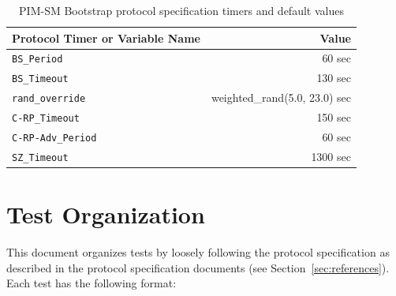 \documentclass[11pt]{report}
\begin{document}
\begin{table}[h]
\begin{center}
\begin{tabular}{|l|r|}
\hline
Protocol Timer or Variable Name	& Value		\\
\hline
\hline
\verb=BS_Period=		& 60 sec	\\
\verb=BS_Timeout=		& 130 sec	\\
\verb=rand_override=		& weighted\_rand(5.0, 23.0) sec \\
\verb=C-RP_Timeout=		& 150 sec	\\
\verb=C-RP-Adv_Period=		& 60 sec	\\
\verb=SZ_Timeout=		& 1300 sec	\\
\hline
\end{tabular}
\caption{PIM-SM Bootstrap protocol specification timers and default values}
\label{table:pim_sm_bootstrap_spec_values}
\end{center}
\end{table}

\section{Test Organization}

This document organizes tests by loosely following the protocol specification
as described in the protocol specification documents (see
Section~\ref{sec:references}). Each test has the following format:
\end{document}
